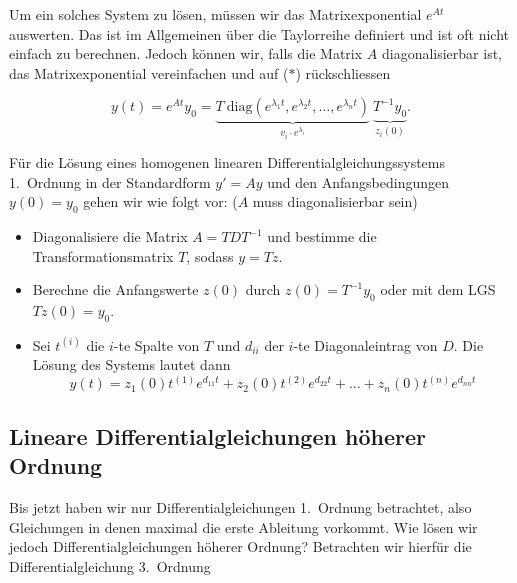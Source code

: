 Um ein solches System zu lösen, müssen wir das Matrixexponential \( e^{At} \) auswerten. Das ist im Allgemeinen über die Taylorreihe definiert und ist oft nicht einfach zu berechnen. Jedoch können wir, falls die Matrix \( A \) diagonalisierbar ist, das Matrixexponential vereinfachen und auf (\(*\)) rückschliessen

\begin{equation*}
    y(t) = e^{At} y_0 = \underbrace{T \ \text{diag}(e^{\lambda_1 t}, e^{\lambda_2 t}, \ldots, e^{\lambda_n t})}_{v_i \cdot e^{\lambda_i}} \ \underbrace{T^{-1} y_0}_{z_i(0)}.
\end{equation*}

\begin{tcolorbox}[colback=gray!30, colframe=gray!80, title=Lösen von homogenen linearen Differentialgleichungssystemen]
    Für die Lösung eines homogenen linearen Differentialgleichungssystems 1.\ Ordnung in der Standardform \( y' = A y \) und den Anfangsbedingungen \( y(0) = y_0 \) gehen wir wie folgt vor: (\(A\) muss diagonalisierbar sein)
    \begin{itemize}
        \item Diagonalisiere die Matrix \( A = TDT^{-1} \) und bestimme die Transformationsmatrix \( T \), sodass  \( y =Tz \).  
        \item Berechne die Anfangswerte \(z(0)\) durch \( z(0) = T^{-1} y_0 \) oder mit dem LGS \( T z(0) = y_0  \). 
        \item Sei \( t^{(i)} \) die \( i \)-te Spalte von \( T \) und \( d_{ii} \) der \( i \)-te Diagonaleintrag von \( D \). Die Lösung des Systems lautet dann
        \begin{equation*}
            y(t) = z_1(0) t^{(1)} e^{d_{11} t} + z_2(0) t^{(2)} e^{d_{22} t} + \ldots + z_n(0) t^{(n)} e^{d_{nn} t}
        \end{equation*}
    \end{itemize}
    
\end{tcolorbox}

\subsection{Lineare Differentialgleichungen höherer Ordnung}

Bis jetzt haben wir nur Differentialgleichungen 1.\ Ordnung betrachtet, also Gleichungen in denen maximal die erste Ableitung vorkommt. Wie lösen wir jedoch Differentialgleichungen höherer Ordnung? Betrachten wir hierfür die Differentialgleichung 3.\ Ordnung

